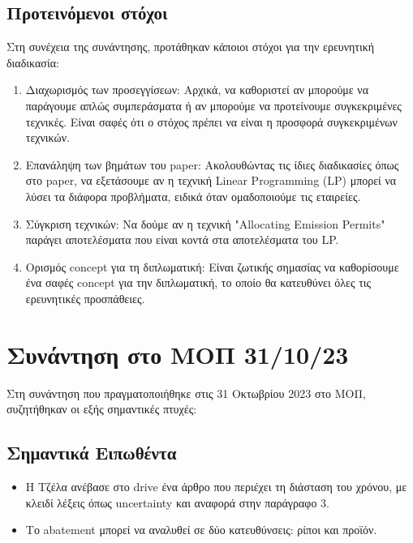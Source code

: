 \documentclass[a4paper,twoside,10pt]{article}
\begin{document}
\subsection{Προτεινόμενοι στόχοι}
Στη συνέχεια της συνάντησης, προτάθηκαν κάποιοι στόχοι για την ερευνητική διαδικασία:

\begin{enumerate}
	\item Διαχωρισμός των προσεγγίσεων: Αρχικά, να καθοριστεί αν μπορούμε να παράγουμε απλώς συμπεράσματα ή αν μπορούμε να προτείνουμε συγκεκριμένες τεχνικές. Είναι σαφές ότι ο στόχος πρέπει να είναι η προσφορά συγκεκριμένων τεχνικών.
	\item Επανάληψη των βημάτων του paper: Ακολουθώντας τις ίδιες διαδικασίες όπως στο paper, να εξετάσουμε αν η τεχνική Linear Programming (LP) μπορεί να λύσει τα διάφορα προβλήματα, ειδικά όταν ομαδοποιούμε τις εταιρείες.
	\item Σύγκριση τεχνικών: Να δούμε αν η τεχνική "Allocating Emission Permits" παράγει αποτελέσματα που είναι κοντά στα αποτελέσματα του LP.
	\item Ορισμός concept για τη διπλωματική: Είναι ζωτικής σημασίας να καθορίσουμε ένα σαφές concept για την διπλωματική, το οποίο θα κατευθύνει όλες τις ερευνητικές προσπάθειες.
\end{enumerate}

\section{Συνάντηση στο ΜΟΠ 31/10/23}
Στη συνάντηση που πραγματοποιήθηκε στις 31 Οκτωβρίου 2023 στο ΜΟΠ, συζητήθηκαν οι εξής σημαντικές πτυχές:

\subsection{Σημαντικά Ειπωθέντα}
\begin{itemize}
	\item Η Τζέλα ανέβασε στο drive ένα άρθρο που περιέχει τη διάσταση του χρόνου, με κλειδί λέξεις όπως uncertainty και αναφορά στην παράγραφο 3.
	\item Το abatement μπορεί να αναλυθεί σε δύο κατευθύνσεις: ρίποι και προϊόν.
\end{itemize}
\end{document}
